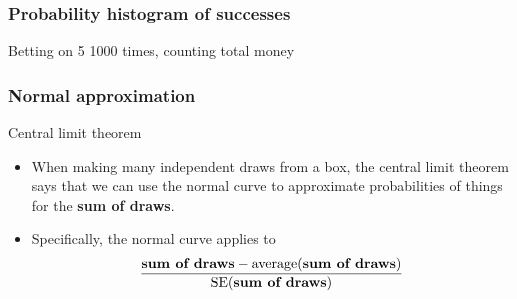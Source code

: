 \documentclass[handout]{beamer}
\begin{document}


   \begin{frame}
   \frametitle{Probability histogram of successes}
   \begin{center}
   \end{center}
   Betting on {\color{red} 5} 1000 times, counting total money
   \end{frame}


   \begin{frame} \frametitle{Normal approximation}

   \begin{block}
   {Central limit theorem}
   \begin{itemize}
   \item When making many independent draws from a box, the central
   limit theorem says that we can use the normal curve to approximate
   probabilities of things for the {\bf sum of draws}.

   \item Specifically, the normal curve applies to
     $$
     \frac{\text{{\bf sum of draws}} - \text{average({\bf sum of draws})}}{\text{SE({\bf sum of draws})}}
     $$
   \end{itemize}
   \end{block}
   \end{frame}

\end{document}
